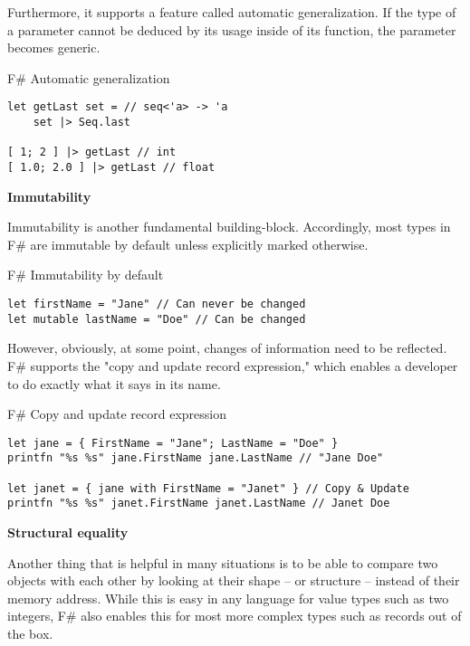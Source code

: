 Furthermore, it supports a feature called automatic generalization. If the type of a parameter cannot be deduced by its usage inside of its function, the parameter becomes generic.

\begin{listing}[H]
\caption{F\# Automatic generalization}
\begin{verbatim}
let getLast set = // seq<'a> -> 'a
    set |> Seq.last

[ 1; 2 ] |> getLast // int
[ 1.0; 2.0 ] |> getLast // float
\end{verbatim}
\end{listing}

\textbf{Immutability}

Immutability is another fundamental building-block. Accordingly, most types in F\# are immutable by default unless explicitly marked otherwise.

\begin{listing}[H]
\caption{F\# Immutability by default}
\begin{verbatim}
let firstName = "Jane" // Can never be changed
let mutable lastName = "Doe" // Can be changed
\end{verbatim}
\end{listing}

However, obviously, at some point, changes of information need to be reflected. F\# supports the "copy and update record expression," which enables a developer to do exactly what it says in its name.

\begin{listing}[H]
\caption{F\# Copy and update record expression}
\begin{verbatim}
let jane = { FirstName = "Jane"; LastName = "Doe" }
printfn "%s %s" jane.FirstName jane.LastName // "Jane Doe"

let janet = { jane with FirstName = "Janet" } // Copy & Update
printfn "%s %s" janet.FirstName janet.LastName // Janet Doe
\end{verbatim}
\end{listing}

\textbf{Structural equality}

Another thing that is helpful in many situations is to be able to compare two objects with each other by looking at their shape – or structure – instead of their memory address. While this is easy in any language for value types such as two integers, F\# also enables this for most more complex types such as records out of the box.

